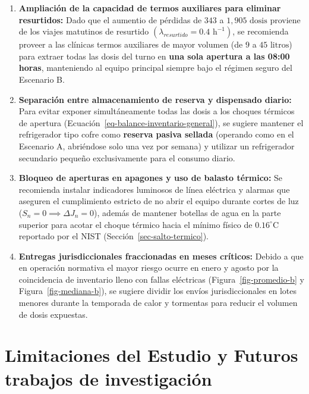\documentclass[
  spanish,
  us-letterpaper,
]{scrreprt}
\providecommand{\tightlist}{%
  \setlength{\itemsep}{0pt}\setlength{\parskip}{0pt}}
\numberwithin{equation}{section}
\theoremstyle{plain}
\theoremstyle{plain}
\theoremstyle{plain}
\theoremstyle{definition}
\theoremstyle{remark}
\begin{document}
\begin{enumerate}
\def\labelenumi{\arabic{enumi}.}
\tightlist
\item
  \textbf{Ampliación de la capacidad de termos auxiliares para eliminar
  resurtidos:} Dado que el aumentio de pérdidas de \(343\) a
  \(1,905\text{ dosis}\) proviene de los viajes matutinos de resurtido
  \(\left( \lambda_{resurtido} = 0.4\text{ h}^{-1} \right)\), se
  recomienda proveer a las clínicas termos auxiliares de mayor volumen
  (de \(9\) a \(45\text{ litros}\)) para extraer todas las dosis del
  turno en \textbf{una sola apertura a las 08:00 horas}, manteniendo al
  equipo principal siempre bajo el régimen seguro del Escenario B.
\item
  \textbf{Separación entre almacenamiento de reserva y dispensado
  diario:} Para evitar exponer simultáneamente todas las dosis a los
  choques térmicos de apertura
  (Ecuación~\ref{eq-balance-inventario-general}), se sugiere mantener el
  refrigerador tipo cofre como \textbf{reserva pasiva sellada} (operando
  como en el Escenario A, abriéndose solo una vez por semana) y utilizar
  un refrigerador secundario pequeño exclusivamente para el consumo
  diario.
\item
  \textbf{Bloqueo de aperturas en apagones y uso de balasto térmico:} Se
  recomienda instalar indicadores luminosos de línea eléctrica y alarmas
  que aseguren el cumplimiento estricto de no abrir el equipo durante
  cortes de luz (\(S_n = 0 \implies \Delta J_n = 0\)), además de
  mantener botellas de agua en la parte superior para acotar el choque
  térmico hacia el mínimo físico de \(0.16^\circ\text{C}\) reportado por
  el NIST (Sección~\ref{sec-salto-termico}).
\item
  \textbf{Entregas jurisdiccionales fraccionadas en meses críticos:}
  Debido a que en operación normativa el mayor riesgo ocurre en enero y
  agosto por la coincidencia de inventario lleno con fallas eléctricas
  (Figura~\ref{fig-promedio-b} y Figura~\ref{fig-mediana-b}), se sugiere
  dividir los envíos jurisdiccionales en lotes menores durante la
  temporada de calor y tormentas para reducir el volumen de dosis
  expuestas.
\end{enumerate}

\section{Limitaciones del Estudio y Futuros trabajos de
investigación}\label{limitaciones-del-estudio-y-futuros-trabajos-de-investigaciuxf3n}
\end{document}

